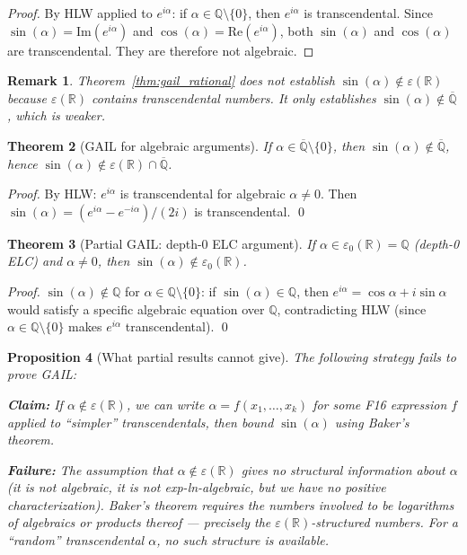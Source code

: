 \documentclass[11pt]{article}
\newtheorem{theorem}{Theorem}
\newtheorem{proposition}[theorem]{Proposition}
\newtheorem{remark}[theorem]{Remark}
\begin{document}
\begin{proof}
By HLW applied to $e^{i\alpha}$: if $\alpha \in \mathbb{Q} \setminus \{0\}$,
then $e^{i\alpha}$ is transcendental. Since $\sin(\alpha) = \mathrm{Im}(e^{i\alpha})$
and $\cos(\alpha) = \mathrm{Re}(e^{i\alpha})$, both $\sin(\alpha)$ and $\cos(\alpha)$
are transcendental. They are therefore not algebraic.
\end{proof}

\begin{remark}
Theorem~\ref{thm:gail_rational} does \emph{not} establish $\sin(\alpha) \notin \varepsilon(\mathbb{R})$
because $\varepsilon(\mathbb{R})$ contains transcendental numbers.
It only establishes $\sin(\alpha) \notin \overline{\mathbb{Q}}$, which is weaker.
\end{remark}

\begin{theorem}[GAIL for algebraic arguments]
\label{thm:gail_alg}
If $\alpha \in \overline{\mathbb{Q}} \setminus \{0\}$, then
$\sin(\alpha) \notin \overline{\mathbb{Q}}$, hence $\sin(\alpha) \notin
\varepsilon(\mathbb{R}) \cap \overline{\mathbb{Q}}$.
\end{theorem}

\begin{proof}
By HLW: $e^{i\alpha}$ is transcendental for algebraic $\alpha \neq 0$.
Then $\sin(\alpha) = (e^{i\alpha} - e^{-i\alpha})/(2i)$ is transcendental. \qed
\end{proof}

\begin{theorem}[Partial GAIL: depth-0 ELC argument]
\label{thm:gail_depth0}
If $\alpha \in \varepsilon_0(\mathbb{R}) = \mathbb{Q}$ (depth-0 ELC) and $\alpha \neq 0$,
then $\sin(\alpha) \notin \varepsilon_0(\mathbb{R})$.
\end{theorem}

\begin{proof}
$\sin(\alpha) \notin \mathbb{Q}$ for $\alpha \in \mathbb{Q} \setminus \{0\}$:
if $\sin(\alpha) \in \mathbb{Q}$, then $e^{i\alpha} = \cos\alpha + i\sin\alpha$
would satisfy a specific algebraic equation over $\mathbb{Q}$, contradicting
HLW (since $\alpha \in \mathbb{Q} \setminus \{0\}$ makes $e^{i\alpha}$ transcendental). \qed
\end{proof}

\begin{proposition}[What partial results cannot give]
The following strategy fails to prove GAIL:

\textbf{Claim:} If $\alpha \notin \varepsilon(\mathbb{R})$, we can write
$\alpha = f(x_1, \ldots, x_k)$ for some F16 expression $f$ applied to ``simpler''
transcendentals, then bound $\sin(\alpha)$ using Baker's theorem.

\textbf{Failure:} The assumption that $\alpha \notin \varepsilon(\mathbb{R})$
gives no structural information about $\alpha$ (it is not algebraic,
it is not exp-ln-algebraic, but we have no positive characterization).
Baker's theorem requires the numbers involved to be logarithms of algebraics
or products thereof — precisely the $\varepsilon(\mathbb{R})$-structured numbers.
For a ``random'' transcendental $\alpha$, no such structure is available.
\end{proposition}
\end{document}
